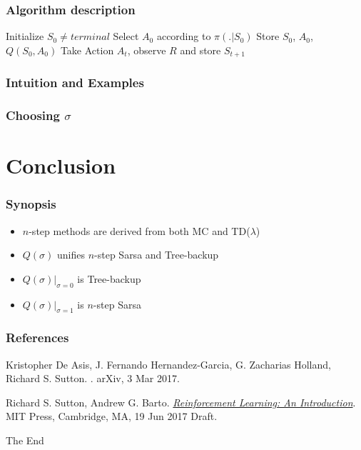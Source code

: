 \documentclass{beamer}
\begin{document}
\begin{frame}
  \frametitle{Algorithm description}
  \begin{algorithmic}
    \STATE Initialize $S_0 \neq {terminal}$
    \STATE Select $A_0$ according to $\pi(. | S_0)$
    \STATE Store $S_0$, $A_0$, $Q(S_0, A_0)$
        \STATE Take Action $A_t$, observe $R$ and store $S_{t + 1}$
      \ENDIF
    \ENDFOR
  \end{algorithmic}
\end{frame}

\begin{frame}
  \frametitle{Intuition and Examples}
\end{frame}

\begin{frame}
  \frametitle{Choosing $\sigma$}
\end{frame}

\section{Conclusion}

\begin{frame}
  \frametitle{Synopsis}
  \begin{itemize}
    \item $n$-step methods are derived from both MC and TD($\lambda$)
    \item $Q(\sigma)$ unifies $n$-step Sarsa and Tree-backup
    \item $Q(\sigma)|_{\sigma=0}$ is Tree-backup
    \item $Q(\sigma)|_{\sigma=1}$ is $n$-step Sarsa
  \end{itemize}
\end{frame}

\begin{frame}
  \frametitle<presentation>{References}

  \begin{thebibliography}{10}

  \beamertemplatebookbibitems

  \beamertemplatearticlebibitems

    Kristopher De Asis, J. Fernando Hernandez-Garcia, G. Zacharias Holland,
    Richard S. Sutton.
    .
    \newblock arXiv, 3 Mar 2017.

   Richard S. Sutton, Andrew G. Barto.  \newblock
    {\href{http://incompleteideas.net/sutton/book/the-book-2nd.html}{\em
      Reinforcement Learning: An Introduction}}.
    \newblock MIT Press, Cambridge, MA, 19 Jun 2017 Draft.

  \end{thebibliography}
\end{frame}


\begin{frame}
\Huge{\centerline{The End}}
\end{frame}

\end{document}
